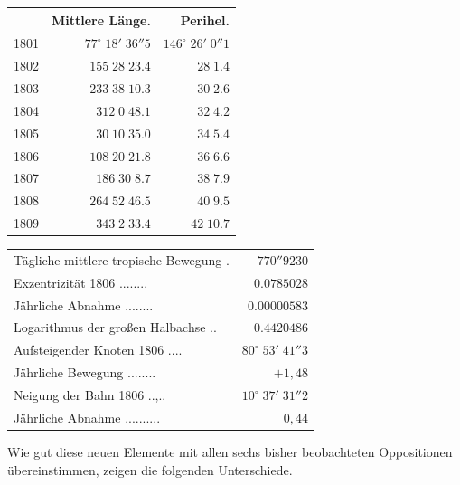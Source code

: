 \begin{center}\fontsize{10}{12}\selectfont\setlength{\tabcolsep}{5pt}\renewcommand{\arraystretch}{1.15}\begin{tabular}{crr}  & Mittlere Länge. & Perihel.\\\hline 1801 & $77^\circ\;18'\;36''5$ & $146^\circ\;26'\;0''1$\\ 1802 & $155\;28\;23.4$ & $\phantom{146}\;28\;1.4$\\ 1803 & $233\;38\;10.3$ & $\phantom{146}\;30\;2.6$\\ 1804 & $312\;0\;48.1$ & $\phantom{146}\;32\;4.2$\\ 1805 & $30\;10\;35.0$ & $\phantom{146}\;34\;5.4$\\ 1806 & $108\;20\;21.8$ & $\phantom{146}\;36\;6.6$\\ 1807 & $186\;30\;8.7$ & $\phantom{146}\;38\;7.9$\\ 1808 & $264\;52\;46.5$ & $\phantom{146}\;40\;9.5$\\ 1809 & $343\;2\;33.4$ & $\phantom{146}\;42\;10.7$\\
\end{tabular}\end{center}

\begin{center}\fontsize{9}{11}\selectfont\setlength{\tabcolsep}{5pt}\renewcommand{\arraystretch}{1.15}\begin{tabular}{lr} Tägliche mittlere tropische Bewegung .\; & $770''9230$\\ Exzentrizität 1806 .\;.\;.\;.\;.\;.\;.\;.\; & $0.0785028$\\ Jährliche Abnahme .\;.\;.\;.\;.\;.\;.\;.\; & $0.00000583$\\ Logarithmus der großen Halbachse .\;.\; & $0.4420486$\\ Aufsteigender Knoten 1806 .\;.\;.\;.\; & $80^\circ\;53'\;41''3$\\ Jährliche Bewegung .\;.\;.\;.\;.\;.\;.\;.\; & $+1{,}48$\\ Neigung der Bahn 1806 .\;.\;,\;.\;.\; & $10^\circ\;37'\;31''2$\\ Jährliche Abnahme .\;.\;.\;.\;.\;.\;.\;.\;.\;.\; & $0{,}44$\\
\end{tabular}\end{center}


\par\indent Wie gut diese neuen Elemente mit allen sechs bisher beobachteten Oppositionen übereinstimmen, zeigen die folgenden Unterschiede.

